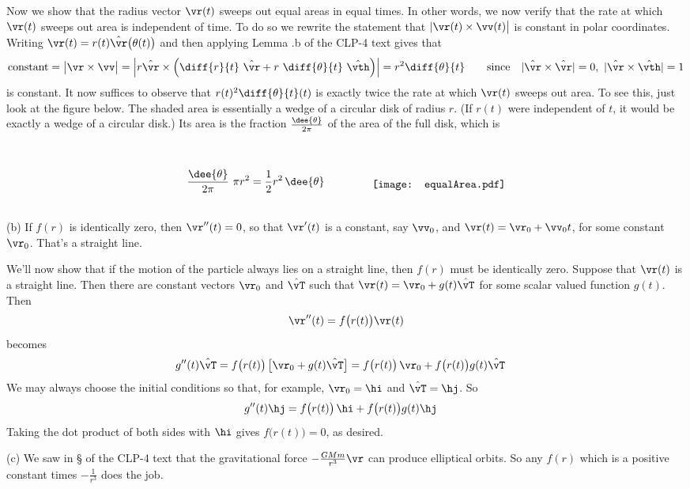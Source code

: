 \begin{solution}
Now we show that the radius vector $\vr(t)$ sweeps out equal areas in 
equal times. In other words, we now verify that the rate at which 
$\vr(t)$ sweeps out area is independent of time. To do so we rewrite the
statement that $|\vr(t)\times\vv(t)\big|$ is constant in polar coordinates.
Writing $\vr(t) = r(t)\hat\vr\big(\theta(t)\big)$ and then applying
Lemma .b of the CLP-4 text gives that
\begin{align*}
\text{constant} = \big|\vr\times\vv\big| 
   = \Big|r\hat\vr\times\Big(\diff{r}{t}\ \hat\vr 
             + r\ \diff{\theta}{t}\ \hat\vth\Big)\Big|
   =r^2\diff{\theta}{t}
\qquad\text{since}\quad |\hat\vr\times\hat\vr|=0,\ 
                        |\hat\vr\times\hat\vth|=1
\end{align*}
is constant. It now suffices to observe that $r(t)^2\diff{\theta}{t}(t)$ 
is exactly twice the rate at which $\vr(t)$ sweeps out area. To see this,
just look at the figure below. The shaded area is essentially a wedge of
a circular disk of radius $r$. (If $r(t)$ were independent of $t$, it would be exactly a wedge of a circular disk.) Its area is the 
fraction $\frac{\dee{\theta}}{2\pi}$ of the area of the full disk, which is
\begin{equation*}
\frac{\dee{\theta}}{2\pi}\ \pi r^2 = \frac{1}{2}r^2\,\dee{\theta}
\qquad\qquad\raisebox{-0.35\height}[42pt][20pt]{
                 \texttt{[image: equalArea.pdf]}}
\end{equation*}

\noindent (b) If $f(r)$ is identically zero, then $\vr''(t)=0$,
so that $\vr'(t)$ is a constant, say $\vv_0$, and $\vr(t) = \vr_0 + \vv_0 t$,
for some constant $\vr_0$. That's a straight line.

We'll now show that if the motion of the particle always lies 
on a straight line, then $f(r)$ must be identically zero.
Suppose that $\vr(t)$ is a straight line. Then there are 
constant vectors $\vr_0$ and $\hat\vT$ such that $\vr(t) =\vr_0+ g(t)\hat\vT$
for some scalar valued function $g(t)$. Then
\begin{align*}
\vr''(t) &= f\big(r(t)\big)\vr(t) \\
\end{align*}
becomes
\begin{align*}
g''(t)\hat\vT & = f\big(r(t)\big)\,\big[\vr_0+ g(t)\hat\vT\big]
              = f\big(r(t)\big)\,\vr_0
               + f\big(r(t)\big) g(t)\hat\vT
\end{align*}
We may always choose the initial conditions so that, for example, 
$\vr_0=\hi$ and $\hat\vT=\hj$.  So
\begin{align*}
g''(t)\hj &   = f\big(r(t)\big)\,\hi
               + f\big(r(t)\big) g(t)\hj
\end{align*}
Taking the dot product of both sides with $\hi$ gives 
$f\big(r(t)\big)=0$, as desired.


\noindent (c) We saw in \S{} of the CLP-4 text
that the gravitational force $-\frac{GMm}{r^3}\vr$ can produce 
elliptical orbits.
So any $f(r)$ which is a positive constant times $-\frac{1}{r^3}$ does 
the job. 

\end{solution}


